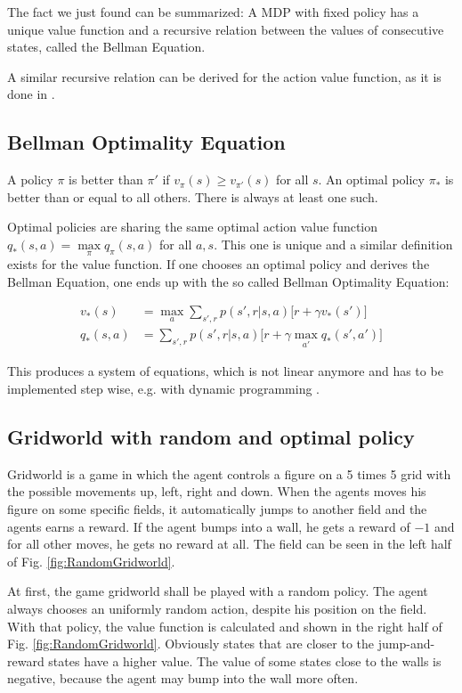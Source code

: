 \documentclass[paper=a4, fontsize=11pt]{scrartcl} %
\numberwithin{equation}{section} %
\numberwithin{figure}{section} %
\numberwithin{table}{section} %
\begin{document}
	The fact we just found can be summarized: A MDP with fixed policy has a unique value function and a recursive relation between the values of consecutive states, called the Bellman Equation. 
	
	A similar recursive relation can be derived for the action value function, as it is done in \cite{SuttonBarto}.

\subsection{Bellman Optimality Equation}

	A policy $\pi$ is better than $\pi'$ if $v_{\pi} (s) \ge v_{\pi'} (s)$ for all $s$. An optimal policy $\pi_{*}$ is better than or equal to all others. There is always at least one such.
	
	Optimal policies are sharing the same optimal action value function $q_{*}(s,a) = \max\limits_{\pi} q_{\pi} (s,a)$ for all $a,s$. This one is unique and a similar definition exists for the value function. If one chooses an optimal policy and derives the Bellman Equation, one ends up with the so called Bellman Optimality Equation:
	
	\begin{align}
	v_{*} (s) &= \max\limits_{a} \sum_{s',r} p(s',r | s,a) \big[ r + \gamma v_{*} (s') \big]\\
	q_{*} (s,a) &= \sum_{s',r} p(s',r | s,a) \big[ r + \gamma  \max\limits_{a'} q_{*} (s', a') \big] 
	\end{align}

	This produces a system of equations, which is not linear anymore and has to be implemented step wise, e.g. with dynamic programming \cite{SuttonBarto}.

\subsection{Gridworld with random and optimal policy}

	Gridworld is a game in which the agent controls a figure on a 5 times 5 grid with the possible movements up, left, right and down. When the agents moves his figure on some specific fields, it automatically jumps to another field and the agents earns a reward. If the agent bumps into a wall, he gets a reward of $-1$ and for all other moves, he gets no reward at all. The field can be seen in the left half of Fig. \ref{fig:RandomGridworld}. 
	
	At first, the game gridworld shall be played with a random policy. The agent always chooses an uniformly random action, despite his position on the field. With that policy, the value function is calculated and shown in the right half of Fig. \ref{fig:RandomGridworld}. Obviously states that are closer to the jump-and-reward states have a higher value. The value of some states close to the walls is negative, because the agent may bump into the wall more often.  
\end{document}

